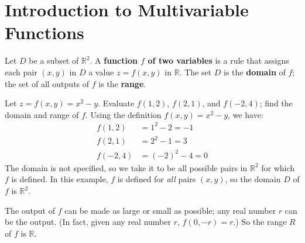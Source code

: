 \section{Introduction to Multivariable Functions}\label{sec:multi_intro}

\begin{definition}\label{def:multi2}%
Let $D$ be a subset of $\mathbb{R}^2$. A \textbf{function $f$ of two variables} is a rule that assigns each pair $(x,y)$ in $D$ a value $z=f(x,y)$ in $\mathbb{R}$. The set $D$ is the \textbf{domain} of $f$; the set of all outputs of $f$ is the \textbf{range}.
\end{definition}


\begin{example}\label{ex_multi1}%
Let $z=f(x,y) = x^2-y$. Evaluate $f(1,2)$, $f(2,1)$, and $f(-2,4)$; find the domain and range of $f$.
\solution
Using the definition $f(x,y) = x^2-y$, we have:
\begin{align*}
f(1,2) &= 1^2-2 = -1\\
f(2,1) &=	2^2-1 = 3\\
f(-2,4) &= (-2)^2-4 = 0
\end{align*}
The domain is not specified, so we take it to be all possible pairs in $\mathbb{R}^2$ for which $f$ is defined. In this example, $f$ is defined for \emph{all} pairs $(x,y)$, so the domain $D$ of $f$ is $\mathbb{R}^2$. 

The output of $f$ can be made as large or small as possible; any real number $r$ can be the output. (In fact, given any real number $r$, $f(0,-r)=r$.) So the range $R$ of $f$ is $\mathbb{R}$.
\end{example}


